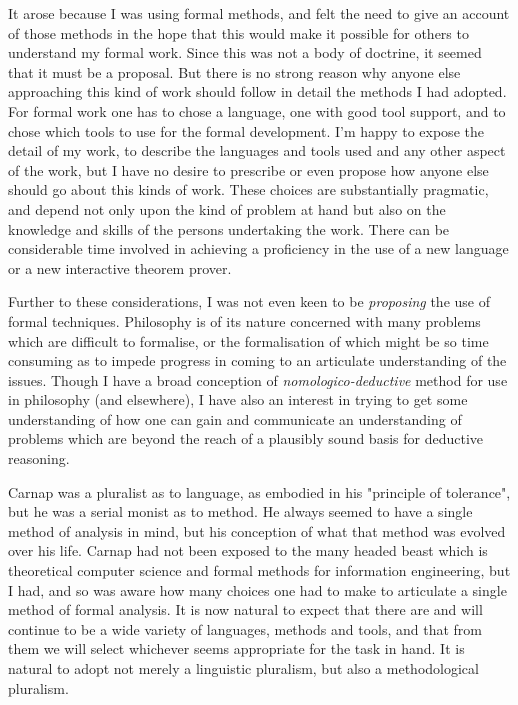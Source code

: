 It arose because I was using formal methods, and felt the need to give an account of those methods in the hope that this would make it possible for others to understand my formal work.
Since this was not a body of doctrine, it seemed that it must be a proposal.
But there is no strong reason why anyone else approaching this kind of work should follow in detail the methods I had adopted.
For formal work one has to chose a language, one with good tool support, and to chose which tools to use for the formal development.
I'm happy to expose the detail of my work, to describe the languages and tools used and any other aspect of the work, but I have no desire to prescribe or even propose how anyone else should go about this kinds of work.
These choices are substantially pragmatic, and depend not only upon the kind of problem at hand but also on the knowledge and skills of the persons undertaking the work.
There can be considerable time involved in achieving a proficiency in the use of a new language or a new interactive theorem prover.

Further to these considerations, I was not even keen to be \emph{proposing} the use of formal techniques.
Philosophy is of its nature concerned with many problems which are difficult to formalise, or the formalisation of which might be so time consuming as to impede progress in coming to an articulate understanding of the issues.
Though I have a broad conception of \emph{nomologico-deductive} method for use in philosophy (and elsewhere), I have also an interest in trying to get some understanding of how one can gain and communicate an understanding of problems which are beyond the reach of a plausibly sound basis for deductive reasoning.

Carnap was a pluralist as to language, as embodied in his "principle of tolerance", but he was a serial monist as to method.
He always seemed to have a single method of analysis in mind, but his conception of what that method was evolved over his life.
Carnap had not been exposed to the many headed beast which is theoretical computer science and formal methods for information engineering, but I had, and so was aware how many choices one had to make to articulate a single method of formal analysis.
It is now natural to expect that there are and will continue to be a wide variety of languages, methods and tools, and that from them we will select whichever seems appropriate for the task in hand.
It is natural to adopt not merely a linguistic pluralism, but also a methodological pluralism.


